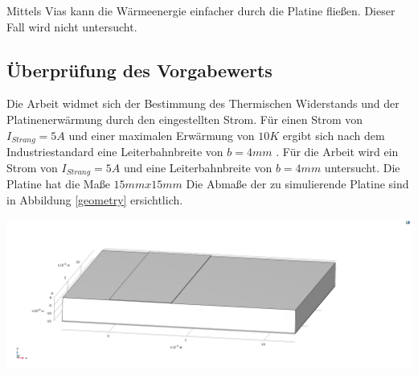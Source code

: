 \documentclass[10pt,a4paper,oneside,abstracton]{scrartcl}
\newenvironment{Figure}
  {\par\medskip\noindent\minipage{\linewidth}}
  {\endminipage\par\medskip}
\begin{document}
\begin{multicols}{2}
\noindent
Mittels Vias kann die Wärmeenergie einfacher durch die Platine fließen. 
Dieser Fall wird nicht untersucht.

\noindent



\subsection{Überprüfung des Vorgabewerts}
Die Arbeit widmet sich der Bestimmung des Thermischen Widerstands und der 
Platinenerwärmung durch den eingestellten Strom. 
\newline
Für einen Strom von $I_{Strang} = 5 A $ und einer maximalen Erwärmung von $10 K$ ergibt sich nach dem Industriestandard eine
Leiterbahnbreite von $b = 4 mm $ \cite{ipc}. \newline
Für die Arbeit wird ein Strom von $I_{Strang} = 5 A $ und eine Leiterbahnbreite von $b = 4 mm $ untersucht.
Die Platine hat die Maße $15mm x 15mm$
Die Abmaße der zu simulierende Platine sind in Abbildung \ref*{geometry} ersichtlich.


\begin{Figure}
	\includegraphics[width=\textwidth]{Bilder/Geometrie.png}
	\label{geometry}
\end{Figure}


\end{multicols}
\end{document}
